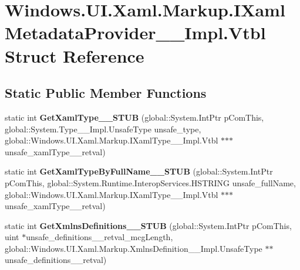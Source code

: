 \hypertarget{struct_windows_1_1_u_i_1_1_xaml_1_1_markup_1_1_i_xaml_metadata_provider_____impl_1_1_vtbl}{}\section{Windows.\+U\+I.\+Xaml.\+Markup.\+I\+Xaml\+Metadata\+Provider\+\_\+\+\_\+\+Impl.\+Vtbl Struct Reference}
\label{struct_windows_1_1_u_i_1_1_xaml_1_1_markup_1_1_i_xaml_metadata_provider_____impl_1_1_vtbl}
\subsection*{Static Public Member Functions}
\begin{DoxyCompactItemize}
\item 
\mbox{\label{struct_windows_1_1_u_i_1_1_xaml_1_1_markup_1_1_i_xaml_metadata_provider_____impl_1_1_vtbl_a2cfb95c2a77a88a14f48b5cd9d709cc9}} 
static int {\bfseries Get\+Xaml\+Type\+\_\+\+\_\+\+S\+T\+UB} (global\+::\+System.\+Int\+Ptr p\+Com\+This, global\+::\+System.\+Type\+\_\+\+\_\+\+Impl.\+Unsafe\+Type unsafe\+\_\+type, global\+::\+Windows.\+U\+I.\+Xaml.\+Markup.\+I\+Xaml\+Type\+\_\+\+\_\+\+Impl.\+Vtbl $\ast$$\ast$$\ast$unsafe\+\_\+xaml\+Type\+\_\+\+\_\+retval)
\item 
\mbox{\label{struct_windows_1_1_u_i_1_1_xaml_1_1_markup_1_1_i_xaml_metadata_provider_____impl_1_1_vtbl_a5963d1e625e7b53afbf68b97f7bcf391}} 
static int {\bfseries Get\+Xaml\+Type\+By\+Full\+Name\+\_\+\+\_\+\+S\+T\+UB} (global\+::\+System.\+Int\+Ptr p\+Com\+This, global\+::\+System.\+Runtime.\+Interop\+Services.\+H\+S\+T\+R\+I\+NG unsafe\+\_\+full\+Name, global\+::\+Windows.\+U\+I.\+Xaml.\+Markup.\+I\+Xaml\+Type\+\_\+\+\_\+\+Impl.\+Vtbl $\ast$$\ast$$\ast$unsafe\+\_\+xaml\+Type\+\_\+\+\_\+retval)
\item 
\mbox{\label{struct_windows_1_1_u_i_1_1_xaml_1_1_markup_1_1_i_xaml_metadata_provider_____impl_1_1_vtbl_a537d03a4b931eb3d50583ba33bccdbea}} 
static int {\bfseries Get\+Xmlns\+Definitions\+\_\+\+\_\+\+S\+T\+UB} (global\+::\+System.\+Int\+Ptr p\+Com\+This, uint $\ast$unsafe\+\_\+definitions\+\_\+\+\_\+retval\+\_\+mcg\+Length, global\+::\+Windows.\+U\+I.\+Xaml.\+Markup.\+Xmlns\+Definition\+\_\+\+\_\+\+Impl.\+Unsafe\+Type $\ast$$\ast$unsafe\+\_\+definitions\+\_\+\+\_\+retval)
$$
\end{DoxyCompactItemize}
